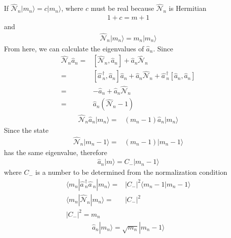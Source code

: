 If $\widehat{\mathcal{N}}_n|m_n\rangle=c|m_n\rangle$, where $c$ must be real because $\widehat{\mathcal{N}}_n$ is Hermitian
\begin{align}
  1+c=m+1
\end{align}
and
\begin{align}
  \widehat{\mathcal{N}}_n|m_n\rangle=m_n|m_n\rangle
\end{align}
From here, we can calculate the eigenvalues of $\widehat{a}_n$. Since
\begin{align}
\widehat{\mathcal{N}}_n\widehat{a}_n=&  
\left[\widehat{\mathcal{N}}_n,\widehat{a}_n\right]+
\widehat{a}_n\widehat{\mathcal{N}}_n\nonumber\\
=&\left[\widehat{a\,}_n^\dagger,\widehat{a}_n\right]\widehat{a}_n
+\widehat{a}_n\widehat{\mathcal{N}}_n
+\widehat{a\,}_n^\dagger\left[\widehat{a}_n,\widehat{a}_n\right]\nonumber\\
=&-\widehat{a}_n+\widehat{a}_n\widehat{\mathcal{N}}_n\nonumber\\
=&\widehat{a}_n\left(\widehat{\mathcal{N}}_n-1\right)
\end{align}
\begin{align}
  \widehat{\mathcal{N}}_n\widehat{a}_n|m_n\rangle=&(m_n-1)\widehat{a}_n|m_n\rangle
\end{align}
Since the state
\begin{align}
   \widehat{\mathcal{N}}_n|m_n-1\rangle=&(m_n-1)|m_n-1\rangle
\end{align}
has the same eigenvalue, therefore
\begin{align}
  \widehat{a}_n|m\rangle=C_-|m_n-1\rangle
\end{align}
where $C_-$ is a number to be determined from the normalization condition
\begin{align}
\label{eq:131}
   \langle m_n|\widehat{a\,}_{n}^\dagger\widehat{a\,}_{n}  |m_n\rangle=&
\left|C_-\right|^2\langle m_n-1|m_n-1\rangle\nonumber\\
   \langle m_n|\widehat{\mathcal{N}}_n|m_n\rangle=&
\left|C_-\right|^2\nonumber\\
\left|C_-\right|^2=m_n
\end{align}
\begin{align}
  \widehat{a}_n|m_n\rangle=\sqrt{m_n}|m_n-1\rangle
\end{align}



